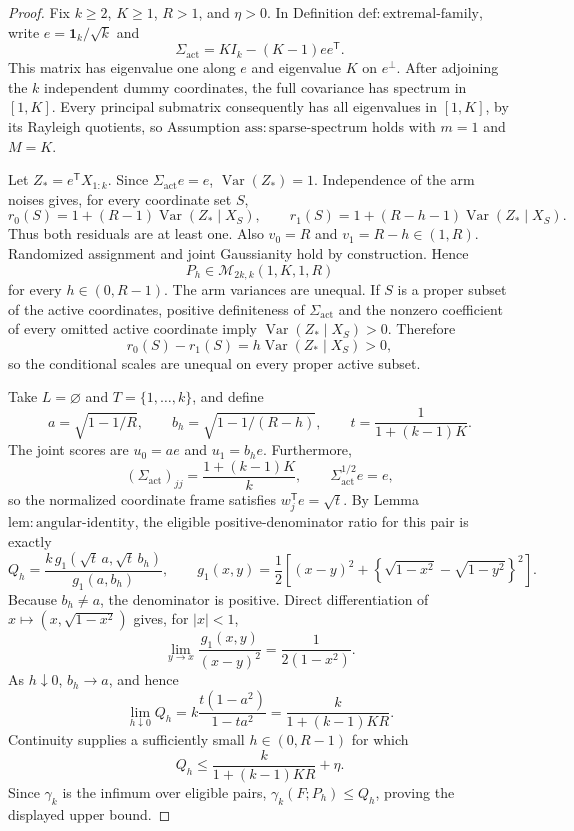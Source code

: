 \documentclass{article}
\begin{document}
\begin{proof}
Fix \(k\ge2\), \(K\ge1\), \(R>1\), and \(\eta>0\). In Definition \(\mathrm{def{:}extremal\text{-}family}\), write \(e=\mathbf1_k/\sqrt{k}\) and
\[
 \Sigma_{\mathrm{act}}=KI_k-(K-1)ee^{\mathsf T}.
\]
This matrix has eigenvalue one along \(e\) and eigenvalue \(K\) on \(e^\perp\). After adjoining the \(k\) independent dummy coordinates, the full covariance has spectrum in \([1,K]\). Every principal submatrix consequently has all eigenvalues in \([1,K]\), by its Rayleigh quotients, so Assumption \(\mathrm{ass{:}sparse\text{-}spectrum}\) holds with \(m=1\) and \(M=K\).

Let \(Z_*=e^{\mathsf T}X_{1:k}\). Since \(\Sigma_{\mathrm{act}}e=e\), \(\operatorname{Var}(Z_*)=1\). Independence of the arm noises gives, for every coordinate set \(S\),
\[
 r_0(S)=1+(R-1)\operatorname{Var}(Z_*\mid X_S),
 \qquad
 r_1(S)=1+(R-h-1)\operatorname{Var}(Z_*\mid X_S).
\]
Thus both residuals are at least one. Also \(v_0=R\) and \(v_1=R-h\in(1,R)\). Randomized assignment and joint Gaussianity hold by construction. Hence
\[
 P_h\in\mathcal M_{2k,k}(1,K,1,R)
\]
for every \(h\in(0,R-1)\). The arm variances are unequal. If \(S\) is a proper subset of the active coordinates, positive definiteness of \(\Sigma_{\mathrm{act}}\) and the nonzero coefficient of every omitted active coordinate imply \(\operatorname{Var}(Z_*\mid X_S)>0\). Therefore
\[
 r_0(S)-r_1(S)=h\operatorname{Var}(Z_*\mid X_S)>0,
\]
so the conditional scales are unequal on every proper active subset.

Take \(L=\varnothing\) and \(T=\{1,\ldots,k\}\), and define
\[
 a=\sqrt{1-1/R},\qquad
 b_h=\sqrt{1-1/(R-h)},\qquad
 t=\frac1{1+(k-1)K}.
\]
The joint scores are \(u_0=ae\) and \(u_1=b_he\). Furthermore,
\[
 (\Sigma_{\mathrm{act}})_{jj}=\frac{1+(k-1)K}{k},
 \qquad \Sigma_{\mathrm{act}}^{1/2}e=e,
\]
so the normalized coordinate frame satisfies \(w_j^{\mathsf T}e=\sqrt t\). By Lemma \(\mathrm{lem{:}angular\text{-}identity}\), the eligible positive-denominator ratio for this pair is exactly
\[
 Q_h=\frac{k\,g_1(\sqrt t\,a,\sqrt t\,b_h)}{g_1(a,b_h)},
 \qquad
 g_1(x,y)=\frac12\left[(x-y)^2+\left\{\sqrt{1-x^2}-\sqrt{1-y^2}\right\}^2\right]. \tag{15}
\]
Because \(b_h\ne a\), the denominator is positive. Direct differentiation of \(x\mapsto(x,\sqrt{1-x^2})\) gives, for \(|x|<1\),
\[
 \lim_{y\to x}\frac{g_1(x,y)}{(x-y)^2}=\frac1{2(1-x^2)}.
\]
As \(h\downarrow0\), \(b_h\to a\), and hence
\[
 \lim_{h\downarrow0}Q_h
 =k\frac{t(1-a^2)}{1-ta^2}
 =\frac{k}{1+(k-1)KR}. \tag{16}
\]
Continuity supplies a sufficiently small \(h\in(0,R-1)\) for which
\[
 Q_h\le\frac{k}{1+(k-1)KR}+\eta.
\]
Since \(\gamma_k\) is the infimum over eligible pairs, \(\gamma_k(F;P_h)\le Q_h\), proving the displayed upper bound.


\end{proof}
\end{document}
